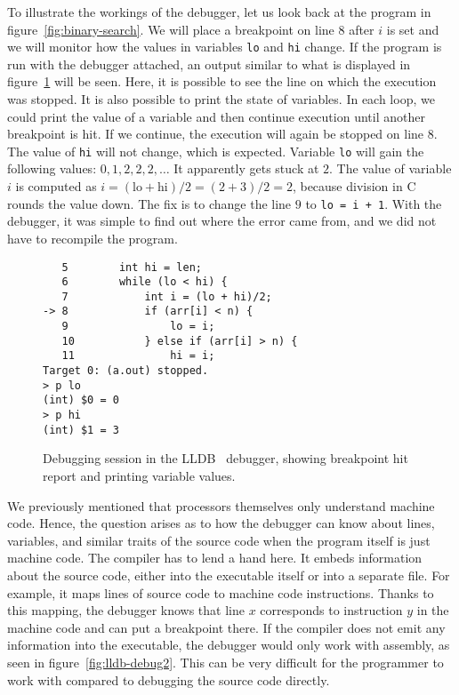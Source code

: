 To illustrate the workings of the debugger, let us look back at the program in
figure~\ref{fig:binary-search}. We will place a breakpoint on line $8$ after
$i$ is set and we will monitor how the values in variables \texttt{lo} and
\texttt{hi} change. If the program is run with the debugger attached, an output
similar to what is displayed in figure~\ref{fig:lldb-debug1} will be seen.
Here, it is possible to see the line on which the execution was stopped. It is
also possible to print the state of variables. In each loop, we could print the
value of a variable and then continue execution until another breakpoint is
hit. If we continue, the execution will again be stopped on line $8$. The value
of \texttt{hi} will not change, which is expected. Variable \texttt{lo} will
gain the following values: $0, 1, 2, 2, 2, \dots$ It apparently gets stuck at
$2$. The value of variable $i$ is computed as $i = (\text{lo} + \text{hi})/2 =
(2 + 3)/2 = 2$, because division in C rounds the value down. The fix is to
change the line $9$ to \texttt{lo = i + 1}. With the debugger, it was simple to
find out where the error came from, and we did not have to recompile the
program.

\begin{figure}
\begin{verbatim}
   5   	    int hi = len;
   6   	    while (lo < hi) {
   7   	        int i = (lo + hi)/2;
-> 8   	        if (arr[i] < n) {
   9   	            lo = i;
   10  	        } else if (arr[i] > n) {
   11  	            hi = i;
Target 0: (a.out) stopped.
> p lo
(int) $0 = 0
> p hi
(int) $1 = 3
\end{verbatim}
    \caption{Debugging session in the LLDB~\cite{lldb} debugger, showing
    breakpoint hit report and printing variable values.}
    \label{fig:lldb-debug1}
\end{figure}

We previously mentioned that processors themselves only understand machine
code. Hence, the question arises as to how the debugger can know about lines,
variables, and similar traits of the source code when the program itself is
just machine code. The compiler has to lend a hand here. It embeds information
about the source code, either into the executable itself or into a separate
file. For example, it maps lines of source code to machine code instructions.
Thanks to this mapping, the debugger knows that line $x$ corresponds to
instruction $y$ in the machine code and can put a breakpoint there. If the
compiler does not emit any information into the executable, the debugger would
only work with assembly, as seen in figure~\ref{fig:lldb-debug2}. This can be
very difficult for the programmer to work with compared to debugging the source
code directly.

